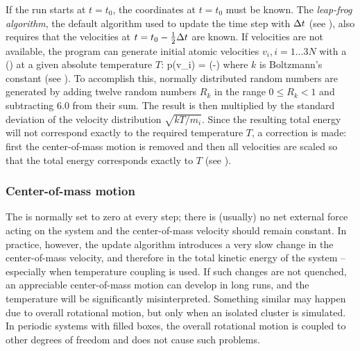 If the run starts at $t=t_0$, the coordinates at $t=t_0$ must be
known. The {\em leap-frog algorithm}, the default algorithm used to 
update the time step with ${\Delta t}$ (see ), also requires 
that the velocities at $t=t_0 - \frac{1}{2} {\Delta t}$ are known. If velocities are not 
available, the program can generate initial atomic velocities 
$v_i, i=1\ldots 3N$ with a  
() at a given absolute temperature $T$:
\beq 
p(v_i) = \exp\left(-\right)
\eeq
where $k$ is Boltzmann's constant (see ).
To accomplish this, normally distributed random numbers are generated
by adding twelve random numbers $R_k$ in the range $0 \le R_k < 1$ and
subtracting 6.0 from their sum. The result is then multiplied by the
standard deviation of the velocity distribution $\sqrt{kT/m_i}$. Since
the resulting total energy will not correspond exactly to the required
temperature $T$, a correction is made: first the center-of-mass motion
is removed and then all velocities are scaled so that the total
energy corresponds exactly to $T$ (see ). 

\subsubsection{Center-of-mass motion}
The  is normally set to zero at
every step; there is (usually) no net external force acting on the
system and the center-of-mass velocity should remain constant. In
practice, however, the update algorithm introduces a very slow change in
the center-of-mass velocity, and therefore in the total kinetic energy of
the system -- especially when temperature coupling is used. If such
changes are not quenched, an appreciable center-of-mass motion
can develop in long runs, and the temperature will be
significantly misinterpreted. Something similar may happen due to overall
rotational motion, but only when an isolated cluster is simulated. In
periodic systems with filled boxes, the overall rotational motion is
coupled to other degrees of freedom and does not cause such problems.


